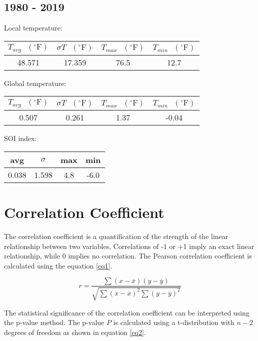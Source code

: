 \documentclass[12pt]{article}
\begin{document}
\subsection*{1980 - 2019}
Local temperature:
\begin{center}
\begin{tabular}{c | c | c | c}
	$T_{avg} \textrm{ } (^{\circ} \textrm{F})$ &
	$\sigma T \textrm{ } (^{\circ} \textrm{F})$ &
	$T_{max} \textrm{ } (^{\circ} \textrm{F})$ &
	$T_{min} \textrm{ } (^{\circ} \textrm{F})$ \\ %
	\hline
	48.571 & 17.359 & 76.5 & 12.7 \\ %
\end{tabular}
\end{center}
Global temperature:
\begin{center}
\begin{tabular}{c | c | c | c}
	$T_{avg} \textrm{ } (^{\circ} \textrm{F})$ &
	$\sigma T \textrm{ } (^{\circ} \textrm{F})$ &
	$T_{max} \textrm{ } (^{\circ} \textrm{F})$ &
	$T_{min} \textrm{ } (^{\circ} \textrm{F})$ \\ %
	\hline
	0.507 & 0.261 & 1.37 & -0.04 \\ %
\end{tabular}
\end{center}
SOI index:
\begin{center}
\begin{tabular}{c | c | c | c}
	avg & $\sigma$ & max & min \\ %
	\hline
	0.038 & 1.598 & 4.8 & -6.0 \\ %
\end{tabular}
\end{center}

\section*{Correlation Coefficient}
The correlation coefficient is a quantification of the
strength of the linear relationship between two variables.
Correlations of -1 or +1 imply an exact linear relationship,
while 0 implies no correlation.
The Pearson correlation coefficient is calculated using
the equation \ref{eq1}.

\begin{equation}\label{eq1}
	r = \frac{\sum (x - \overline{x}) (y - \overline{y})}
        {\sqrt{\sum (x - \overline{x})^2 \sum (y - \overline{y})^2}}
\end{equation}

The statistical significance of the correlation coefficient can be
interpreted using the p-value method.
The p-value $P$ is calculated using a t-distribution with
$n - 2$ degrees of freedom as shown in equation \ref{eq2}.
\end{document}
